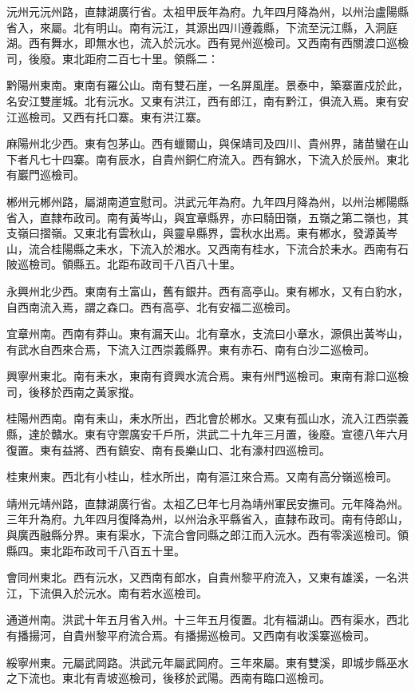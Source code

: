 沅州元沅州路，直隸湖廣行省。太祖甲辰年為府。九年四月降為州，以州治盧陽縣省入，來屬。北有明山。南有沅江，其源出四川遵義縣，下流至沅江縣，入洞庭湖。西有舞水，即無水也，流入於沅水。西有晃州巡檢司。又西南有西關渡口巡檢司，後廢。東北距府二百七十里。領縣二：

黔陽州東南。東南有羅公山。南有雙石崖，一名屏風崖。景泰中，築寨置戍於此，名安江雙崖城。北有沅水。又東有洪江，西有郎江，南有黔江，俱流入焉。東有安江巡檢司。又西有托口寨。東有洪江寨。

麻陽州北少西。東有包茅山。西有蠟爾山，與保靖司及四川、貴州界，諸苗蠻在山下者凡七十四寨。南有辰水，自貴州銅仁府流入。西有錦水，下流入於辰州。東北有巖門巡檢司。

郴州元郴州路，屬湖南道宣慰司。洪武元年為府。九年四月降為州，以州治郴陽縣省入，直隸布政司。南有黃岑山，與宜章縣界，亦曰騎田嶺，五嶺之第二嶺也，其支嶺曰摺嶺。又東北有雲秋山，與靈阜縣界，雲秋水出焉。東有郴水，發源黃岑山，流合桂陽縣之耒水，下流入於湘水。又西南有桂水，下流合於耒水。西南有石陂巡檢司。領縣五。北距布政司千八百八十里。

永興州北少西。東南有土富山，舊有銀井。西有高亭山。東有郴水，又有白豹水，自西南流入焉，謂之森口。西有高亭、北有安福二巡檢司。

宜章州南。西南有莽山。東有漏天山。北有章水，支流曰小章水，源俱出黃岑山，有武水自西來合焉，下流入江西崇義縣界。東有赤石、南有白沙二巡檢司。

興寧州東北。南有耒水，東南有資興水流合焉。東有州門巡檢司。東南有滁口巡檢司，後移於西南之黃家摐。

桂陽州西南。南有耒山，耒水所出，西北會於郴水。又東有孤山水，流入江西崇義縣，達於贛水。東有守禦廣安千戶所，洪武二十九年三月置，後廢。宣德八年六月復置。東有益將、西有鎮安、南有長樂山口、北有濠村四巡檢司。

桂東州東。西北有小桂山，桂水所出，南有漚江來合焉。又南有高分嶺巡檢司。

靖州元靖州路，直隸湖廣行省。太祖乙巳年七月為靖州軍民安撫司。元年降為州。三年升為府。九年四月復降為州，以州治永平縣省入，直隸布政司。南有侍郎山，與廣西融縣分界。東有渠水，下流合會同縣之郎江而入沅水。西有零溪巡檢司。領縣四。東北距布政司千八百五十里。

會同州東北。西有沅水，又西南有郎水，自貴州黎平府流入，又東有雄溪，一名洪江，下流俱入於沅水。南有若水巡檢司。

通道州南。洪武十年五月省入州。十三年五月復置。北有福湖山。西有渠水，西北有播揚河，自貴州黎平府流合焉。有播揚巡檢司。又西南有收溪寨巡檢司。

綏寧州東。元屬武岡路。洪武元年屬武岡府。三年來屬。東有雙溪，即城步縣巫水之下流也。東北有青坡巡檢司，後移於武陽。西南有臨口巡檢司。


